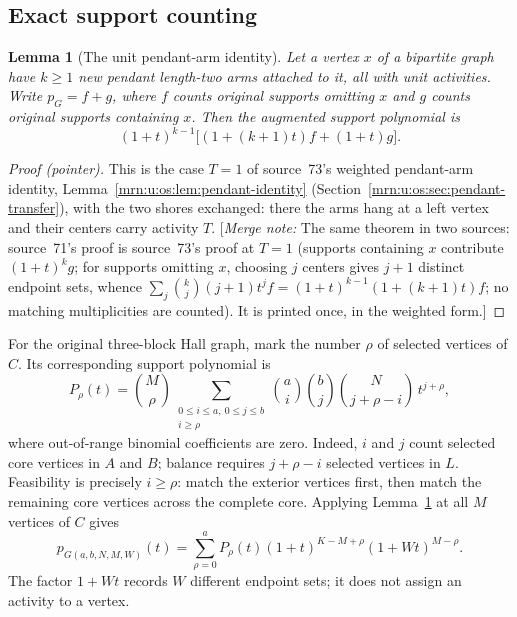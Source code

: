 \documentclass[11pt,a4paper]{article}
\newtheorem{lemma}[theorem]{Lemma}
\theoremstyle{remark}\newtheorem{remark}[theorem]{Remark}
\newcommand{\mnote}[1]{[\textit{Merge note:} #1]}
\begin{document}
\subsection{Exact support counting}
\begin{lemma}[The unit pendant-arm identity]\label{mrn:u:uw:lem:pendant}
Let a vertex $x$ of a bipartite graph have $k\ge1$ new pendant length-two arms attached to it, all with unit activities. Write $p_G=f+g$, where $f$ counts original supports omitting $x$ and $g$ counts original supports containing $x$. Then the augmented support polynomial is
\begin{equation}\label{mrn:u:uw:eq:pendant}
 (1+t)^{k-1}\bigl[(1+(k+1)t)f+(1+t)g\bigr].
\end{equation}
\end{lemma}
\begin{proof}[Proof (pointer)]
This is the case $T=1$ of source~73's weighted pendant-arm identity, Lemma~\ref{mrn:u:os:lem:pendant-identity} (Section~\ref{mrn:u:os:sec:pendant-transfer}), with the two shores exchanged: there the arms hang at a left vertex and their centers carry activity $T$. \mnote{The same theorem in two sources: source~71's proof is source~73's proof at $T=1$ (supports containing $x$ contribute $(1+t)^kg$; for supports omitting $x$, choosing $j$ centers gives $j+1$ distinct endpoint sets, whence $\sum_j\binom kj(j+1)t^jf=(1+t)^{k-1}(1+(k+1)t)f$; no matching multiplicities are counted). It is printed once, in the weighted form.}
\end{proof}

For the original three-block Hall graph, mark the number $\rho$ of selected vertices of $C$. Its corresponding support polynomial is
\begin{equation}\label{mrn:u:uw:eq:marked}
 P_\rho(t)=\binom M\rho
 \sum_{\substack{0\le i\le a,\ 0\le j\le b\\i\ge\rho}}
 \binom ai\binom bj\binom N{j+\rho-i}\,t^{j+\rho},
\end{equation}
where out-of-range binomial coefficients are zero. Indeed, $i$ and $j$ count selected core vertices in $A$ and $B$; balance requires $j+\rho-i$ selected vertices in $L$. Feasibility is precisely $i\ge\rho$: match the exterior vertices first, then match the remaining core vertices across the complete core.
Applying Lemma~\ref{mrn:u:uw:lem:pendant} at all $M$ vertices of $C$ gives
\begin{equation}\label{mrn:u:uw:eq:whole}
 p_{G(a,b,N,M,W)}(t)
 =\sum_{\rho=0}^{a}P_\rho(t)
       (1+t)^{K-M+\rho}(1+Wt)^{M-\rho}.
\end{equation}
The factor $1+Wt$ records $W$ different endpoint sets; it does not assign an activity to a vertex.
\end{document}
